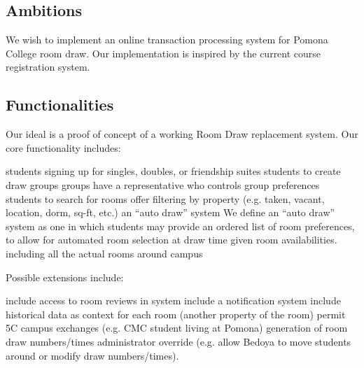 \subsection{Ambitions}

We wish to implement an online transaction processing system for Pomona College
room draw. Our implementation is inspired by the current course registration
system.

\subsection{Functionalities}

Our ideal is a proof of concept of a working Room Draw replacement system. Our
core functionality includes:

\begin{outline}
\1 students signing up for singles, doubles, or friendship suites
\1 students to create draw groups
    \2 groups have a representative who controls group preferences
\1 students to search for rooms
    \2 offer filtering by property (e.g. taken, vacant, location, dorm, sq-ft,
    etc.)
\1 an ``auto draw'' system
    \2 We define an ``auto draw'' system as one in which students may provide an
    ordered list of room preferences, to allow for automated room selection at
    draw time given room availabilities.
\1 including all the actual rooms around campus
\end{outline}

Possible extensions include:

\begin{outline}
\1 include access to room reviews in system
\1 include a notification system
\1 include historical data as context for each room (another property of the
    room)
\1 permit 5C campus exchanges (e.g. CMC student living at Pomona)
\1 generation of room draw numbers/times
\1 administrator override (e.g. allow Bedoya to move students around or modify
    draw numbers/times).
\end{outline}